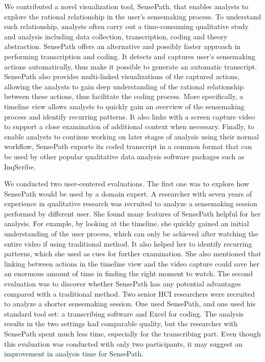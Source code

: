 We contributed a novel visualization tool, SensePath, that enables analysts to explore the rational relationship in the user's sensemaking process. To understand such relationship, analysts often carry out a time-consuming qualitative study and analysis including data collection, transcription, coding and theory abstraction. SensePath offers an alternative and possibly faster approach in performing transcription and coding. It detects and captures user's sensemaking actions automatically, thus make it possible to generate an automatic transcript. SensePath also provides multi-linked visualizations of the captured actions, allowing the analysts to gain deep understanding of the rational relationship between these actions, thus facilitate the coding process. More specifically, a timeline view allows analysts to quickly gain an overview of the sensemaking process and identify recurring patterns. It also links with a screen capture video to support a close examination of additional context when necessary. Finally, to enable analysts to continue working on later stages of analysis using their normal workflow, SensePath exports its coded transcript in a common format that can be used by other popular qualitative data analysis software packages such as InqScribe.

We conducted two user-centered evaluations. The first one was to explore how SensePath would be used by a domain expert. A researcher with seven years of experience in qualitative research was recruited to analyze a sensemaking session performed by different user. She found many features of SensePath helpful for her analysis. For example, by looking at the timeline, she quickly gained an initial understanding of the user process, which can only be achieved after watching the entire video if using traditional method. It also helped her to identify recurring patterns, which she used as cues for further examination. She also mentioned that linking between actions in the timeline view and the video capture could save her an enormous amount of time in finding the right moment to watch. The second evaluation was to discover whether SensePath has any potential advantages compared with a traditional method. Two senior HCI researchers were recruited to analyze a shorter sensemaking session. One used SensePath, and one used his standard tool set: a transcribing software and Excel for coding. The analysis results in the two settings had comparable quality, but the researcher with SensePath spent much less time, especially for the transcribing part. Even though this evaluation was conducted with only two participants, it may suggest an improvement in analysis time for SensePath.

